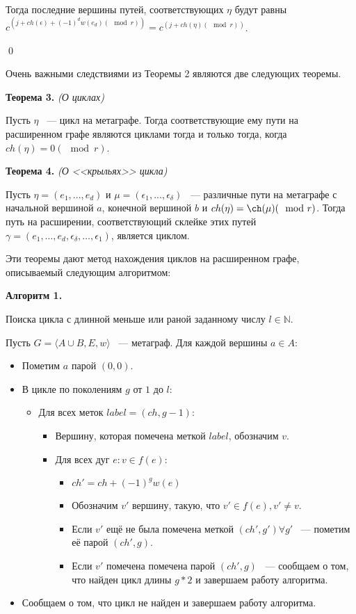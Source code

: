 \documentclass[14pt]{mmcs-article}
\begin{document}
Тогда последние вершины путей, соответствующих $\eta$ будут равны $c^{(j + ch(\epsilon) + (-1)^d w(e_d) (\mod{r}))} = c^{(j + ch(\eta) (\mod{r}))}$.

\qed

Очень важными следствиями из Теоремы 2 являются две следующих теоремы.

\textbf{Теорема 3.} \textsl{(О циклах)}

Пусть $\eta$ ~--- цикл на метаграфе. Тогда соответствующие ему пути на расширенном графе являются циклами тогда и только тогда, когда $ch(\eta) = 0 (\mod{r})$.

\textbf{Теорема 4.} \textsl{(О <<крыльях>> цикла)}

Пусть $\eta = (e_1, ..., e_d)$ и $\mu = (\epsilon_1, ..., \epsilon_{\delta})$ ~--- различные пути на метаграфе с начальной вершиной $a$, конечной вершиной $b$ и $ch(\eta) = \ch(\mu) (\mod{r})$. Тогда путь на расширении, соответствующий склейке этих путей $\gamma = (e_1, \dots, e_d, \epsilon_{\delta}, \dots, \epsilon_1)$, является циклом.

Эти теоремы дают метод нахождения циклов на расширенном графе, описываемый следующим алгоритмом:

\textbf{Алгоритм 1.}


Поиска цикла с длинной меньше или раной заданному числу $l \in \mathbb{N}$.

Пусть $G = \langle A \cup B, E,w\rangle$ ~--- метаграф. Для каждой вершины $a \in A:$

\begin{itemize}
    \item Пометим $a$ парой $(0, 0)$.
    \item В цикле по поколениям $g$ от $1$ до $l$:
      \begin{itemize}
      \item Для всех меток $label = (ch, g - 1)$:
        \begin{itemize}
        \item Вершину, которая помечена меткой $label$, обозначим $v$.
        \item Для всех дуг $e: v \in f(e)$:
          \begin{itemize}
          \item $ch' = ch + (-1)^{g} w(e)$
          \item Обозначим $v'$ вершину, такую, что $v' \in f(e), v' \neq v$.
          \item Если $v'$ ещё не была помечена меткой $(ch', g') \forall g'$ ~--- пометим её парой $(ch', g)$.
          \item Если $v'$ помечена помечена парой $(ch', g)$ ~--- сообщаем о том, что найден цикл длины $g * 2$ и завершаем работу алгоритма.
          \end{itemize}
        \end{itemize}
      \end{itemize}
    \item Сообщаем о том, что цикл не найден и завершаем работу алгоритма.
\end{itemize}
\end{document}
